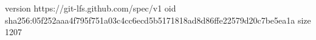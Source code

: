 version https://git-lfs.github.com/spec/v1
oid sha256:05f252aaa4f795f751a03c4cc6ecd5b5171818ad8d86ffe22579d20c7be5ea1a
size 1207
